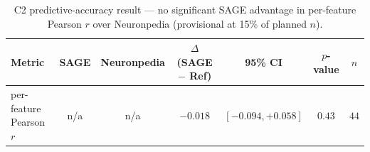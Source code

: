 \begin{table}[t]
\centering
\caption{C2 predictive-accuracy result --- no significant SAGE advantage in per-feature Pearson $r$ over Neuronpedia (provisional at 15\% of planned $n$).}
\label{tab:c2_result}
\begin{tabular}{lcccccc}
\toprule
Metric & SAGE & Neuronpedia & $\Delta$ (SAGE $-$ Ref) & 95\% CI & $p$-value & $n$ \\
\midrule
per-feature Pearson $r$ & n/a & n/a & $-0.018$ & $[-0.094, +0.058]$ & $0.43$ & $44$ \\
\bottomrule
\end{tabular}
\end{table}
